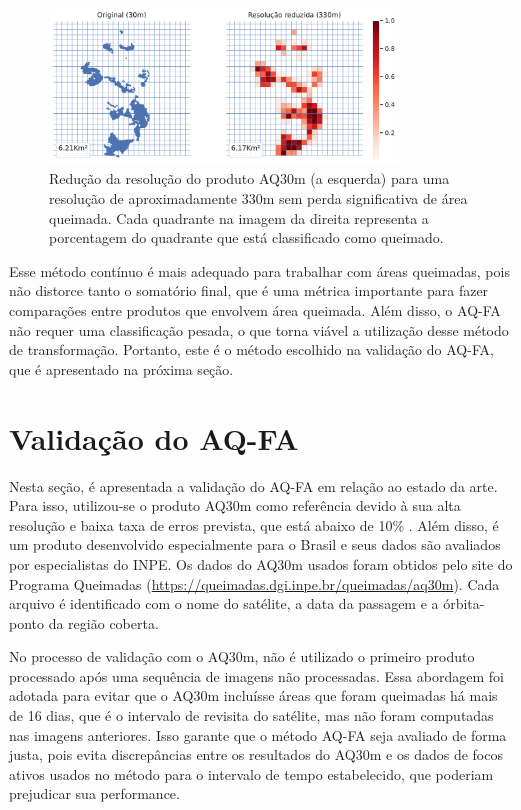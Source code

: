 \documentclass[cic,tc]{iiufrgs}
\begin{document}
\begin{figure}[!htb]
    \caption{Redução da resolução do produto AQ30m (a esquerda) para uma resolução de aproximadamente 330m sem perda significativa de área queimada. Cada quadrante na imagem da direita representa a porcentagem do quadrante que está classificado como queimado.}
    \begin{center}
        \includegraphics[width=25em]{resolução_continua}
    \end{center}
    \label{fig:resolução_continua}
\end{figure}

Esse método contínuo é mais adequado para trabalhar com áreas queimadas, pois não distorce tanto o somatório final, que é uma métrica importante para fazer comparações entre produtos que envolvem área queimada. Além disso, o AQ-FA não requer uma classificação pesada, o que torna viável a utilização desse método de transformação. Portanto, este é o método escolhido na validação do AQ-FA, que é apresentado na próxima seção.

\section{Validação do AQ-FA}
\label{sec:validacao_aq_fa}

Nesta seção, é apresentada a validação do AQ-FA em relação ao estado da arte. Para isso, utilizou-se o produto AQ30m como referência devido à sua alta resolução e baixa taxa de erros prevista, que está abaixo de 10\% \citep{melchiori2014landsat}. Além disso, é um produto desenvolvido especialmente para o Brasil e seus dados são avaliados por especialistas do INPE. Os dados do AQ30m usados foram obtidos pelo site do Programa Queimadas (\url{https://queimadas.dgi.inpe.br/queimadas/aq30m}). Cada arquivo é identificado com o nome do satélite, a data da passagem e a órbita-ponto da região coberta.

No processo de validação com o AQ30m, não é utilizado o primeiro produto processado após uma sequência de imagens não processadas. Essa abordagem foi adotada para evitar que o AQ30m incluísse áreas que foram queimadas há mais de 16 dias, que é o intervalo de revisita do satélite, mas não foram computadas nas imagens anteriores. Isso garante que o método AQ-FA seja avaliado de forma justa, pois evita discrepâncias entre os resultados do AQ30m e os dados de focos ativos usados no método para o intervalo de tempo estabelecido, que poderiam prejudicar sua performance.
\end{document}
